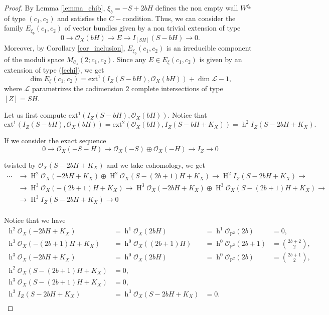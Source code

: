 \documentclass[10pt,a4paper]{amsart}
\newcommand {\ext}{\mathrm{ext}}
\newcommand{\Ho}{\operatorname{H}}
\newcommand{\h}{\operatorname{h}}
\begin{document}
        \begin{proof}
        By Lemma \ref{lemma_chib}, $\xi_b=-S+2bH$ defines the non empty wall $W^{\xi_b}$ of type $(c_1,c_2)$ and satisfies the $C-$condition. Thus, we can consider the family $E_{\xi_b}(c_1,c_2)$ of vector bundles given by a non trivial extension of type 
        \begin{equation}
        \label{echi}
         0\rightarrow\mathcal{O}_X(bH)\rightarrow E\rightarrow I_{[SH]}(S-bH)\rightarrow0.   
        \end{equation} Moreover, by Corollary \ref{cor_inclusion}, $E_{\xi_b}(c_1,c_2)$ is an irreducible component of the moduli space $M_{\mathcal{C}_b}(2;c_1,c_2)$. Since any $E\in E_{\xi}(c_1,c_2)$ is given by an extension of type (\ref{echi}), we get $$\dim{E_{\xi}}(c_1,c_2)=\ext^1 (I_Z(S-bH),\mathcal{O}_X(bH))+\dim\mathcal{L}-1,$$ where $\mathcal{L}$ parametrizes the codimension $2$ complete intersections of type $[Z]=SH$. 

Let us first compute $\ext^1 (I_{Z}(S-bH),\mathcal{O}_X(bH))$. Notice that $$\ext^1 (I_{Z}(S-bH),\mathcal{O}_X(bH))=\ext^2(\mathcal{O}_X(bH), I_Z(S-bH+K_X))=\h^2I_Z(S-2bH+K_X).$$

If we consider the exact sequence 
\begin{equation}
\label{eq_SH}
  0\rightarrow\mathcal{O}_X(-S-H)\rightarrow\mathcal{O}_X(-S)\oplus\mathcal{O}_X(-H)\rightarrow I_Z\rightarrow0  
\end{equation}

 twisted by $\mathcal{O}_X(S-2bH+K_X)$ and we take cohomology, we get 
\begin{equation}
\begin{array}{ll}
\label{suc_coh2}
\cdots &\rightarrow \Ho^2\mathcal{O}_X(-2bH+K_X) \oplus \Ho^2\mathcal{O}_X(S-(2b+1)H+K_X) \rightarrow \Ho^2I_Z(S-2bH+K_X) \rightarrow \\
&\rightarrow \Ho^{3}\mathcal{O}_X(-(2b+1)H+K_X) \rightarrow \Ho^{3}\mathcal{O}_X(-2bH+K_X) \oplus \Ho^{3}\mathcal{O}_X(S-(2b+1)H+K_X) \rightarrow \\
&\rightarrow \Ho^3I_Z(S-2bH+K_X) \rightarrow 0\\
\end{array}
\end{equation}



Notice that we have
\[
\begin{array}{llll}
    \h^2\mathcal{O}_X(-2bH+K_X) &= \h^1\mathcal{O}_X(2bH) &= \h^1\mathcal{O}_{\mathbb{P}^2}(2b) &= 0, \\
    \h^{3}\mathcal{O}_X(-(2b+1)H+K_X) &= \h^0\mathcal{O}_X((2b+1)H) &= \h^0\mathcal{O}_{\mathbb{P}^2}(2b+1) &= \binom{2b+2}{2}, \\
    \h^{3}\mathcal{O}_X(-2bH+K_X) &= \h^0\mathcal{O}_X(2bH) &= \h^0\mathcal{O}_{\mathbb{P}^2}(2b) &= \binom{2b+1}{2}, \\
    \h^2\mathcal{O}_X(S-(2b+1)H+K_X) &= 0, & & \\
    \h^{3}\mathcal{O}_X(S-(2b+1)H+K_X) &=0,&  & \\
    \h^{3}I_Z(S-2bH+K_X) &=\h^{3}\mathcal{O}_X(S-2bH+K_X)&= 0.  & \\
\end{array}
\]


\end{proof}
\end{document}
